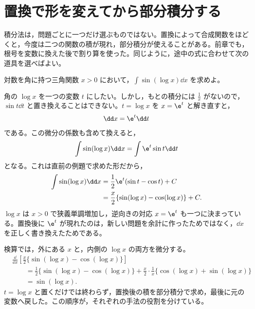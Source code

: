 \section{置換で形を変えてから部分積分する}\label{節:置換と部分積分}

積分法は，問題ごとに一つだけ選ぶものではない。置換によって合成関数をほどくと，今度は二つの関数の積が現れ，部分積分が使えることがある。前章でも，根号を変数に換えた後で割り算を使った。同じように，途中の式に合わせて次の道具を選べばよい。

\begin{example}{対数を角に持つ三角関数}
$x>0$ において，$\int\sin(\log x)\dd x$ を求めよ。
\end{example}

角の $\log x$ を一つの変数 $t$ にしたい。しかし，もとの積分には $\frac1x$ がないので，$\sin t\dd t$ と置き換えることはできない。$t=\log x$ を $x=\e^t$ と解き直すと，
\[
 \dd x=\e^t\dd t
\]
である。この微分の係数も含めて換えると，
\[
 \int\sin(\log x)\dd x
 =\int\e^t\sin t\dd t
\]
となる。これは直前の例題で求めた形だから，
\[
\begin{aligned}
 \int\sin(\log x)\dd x
 &=\frac12\e^t(\sin t-\cos t)+C\\
 &=\frac x2\{\sin(\log x)-\cos(\log x)\}+C.
\end{aligned}
\]
$\log x$ は $x>0$ で狭義単調増加し，逆向きの対応 $x=\e^t$ も一つに決まっている。置換後に $\e^t$ が現れたのは，新しい問題を余計に作ったためではなく，$\dd x$ を正しく書き換えたためである。

検算では，外にある $x$ と，内側の $\log x$ の両方を微分する。
\[
\begin{aligned}
 &\frac{\dd}{\dd x}
 \left[\frac x2\{\sin(\log x)-\cos(\log x)\}\right]\\
 &\qquad=\frac12\{\sin(\log x)-\cos(\log x)\}
   +\frac x2\cdot\frac1x
     \{\cos(\log x)+\sin(\log x)\}\\
 &\qquad=\sin(\log x).
\end{aligned}
\]
$t=\log x$ と置くだけでは終わらず，置換後の積を部分積分で求め，最後に元の変数へ戻した。この順序が，それぞれの手法の役割を分けている。


